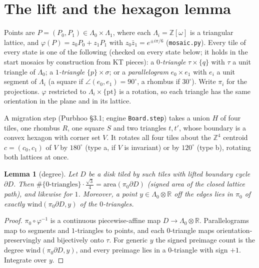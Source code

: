 \documentclass[11pt]{article}
\newtheorem{lemma}[theorem]{Lemma}
\theoremstyle{definition}
\begin{document}
\section{The lift and the hexagon lemma}
Points are $P=(P_0,P_1)\in\Lambda_0\times\Lambda_1$, where each $\Lambda_i=\mathbb Z[\omega]$ is a triangular lattice, and
$\varphi(P)=z_0P_0+z_1P_1$ with $z_0\bar z_1=e^{\pm i\pi/6}$ (\texttt{mosaic.py}). Every tile of every state is one of the following
(checked on every state below; it holds in the start mosaics by construction from KT pieces):
a \emph{$0$-triangle} $\tau\times\{q\}$ with $\tau$ a unit triangle of $\Lambda_0$; a \emph{$1$-triangle} $\{p\}\times\sigma$; or a
\emph{parallelogram} $e_0\times e_1$ with $e_i$ a unit segment of $\Lambda_i$ (a square if $\angle(e_0,e_1)=90^\circ$, a rhombus if $30^\circ$).
Write $\pi_i$ for the projections. $\varphi$ restricted to $\Lambda_i\times\{\mathrm{pt}\}$ is a rotation, so each triangle has the
same orientation in the plane and in its lattice.

A migration step (Purbhoo \S3.1; engine \texttt{Board.step}) takes a union $H$ of four tiles, one rhombus $R$, one square $S$ and two
triangles $t,t'$, whose boundary is a convex hexagon with corner set $V$. It rotates all four tiles about the $\mathbb Z^4$ centroid
$c=(c_0,c_1)$ of $V$ by $180^\circ$ (type a, if $V$ is invariant) or by $120^\circ$ (type b), rotating both lattices at once.

\begin{lemma}[degree]\label{lem:degree}
Let $D$ be a disk tiled by such tiles with lifted boundary cycle $\partial D$. Then
$\#\{0\text{-triangles}\}\cdot\frac{\sqrt3}{4}=\mathrm{area}(\pi_0\partial D)$ (signed area of the closed lattice path), and likewise for $1$.
Moreover, a point $y\in\Lambda_0\otimes\mathbb R$ off the edges lies in $\pi_0$ of exactly $\mathrm{wind}(\pi_0\partial D,y)$ of the $0$-triangles.
\end{lemma}
\begin{proof}
$\pi_0\circ\varphi^{-1}$ is a continuous piecewise-affine map $D\to\Lambda_0\otimes\mathbb R$. Parallelograms map to segments and
$1$-triangles to points, and each $0$-triangle maps orientation-preservingly and bijectively onto $\tau$. For generic $y$ the signed
preimage count is the degree $\mathrm{wind}(\pi_0\partial D,y)$, and every preimage lies in a $0$-triangle with sign $+1$. Integrate over $y$.
\end{proof}
\end{document}
